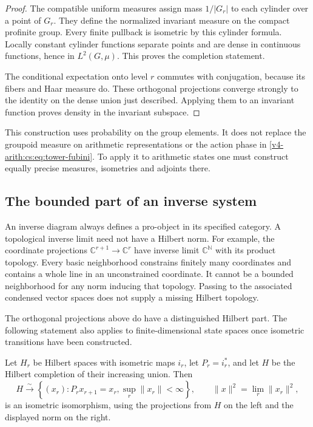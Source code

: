 \begin{proof}
The compatible uniform measures assign mass \(1/|G_r|\) to each cylinder
over a point of \(G_r\). They define the normalized invariant measure on the
compact profinite group. Every finite pullback is isometric by this cylinder
formula. Locally constant cylinder functions separate points and are dense
in continuous functions, hence in \(L^2(G,\mu)\). This proves the completion
statement.

The conditional expectation onto level \(r\) commutes with conjugation,
because its fibers and Haar measure do. These orthogonal projections
converge strongly to the identity on the dense union just described.
Applying them to an invariant function proves density in the invariant
subspace.
\end{proof}

This construction uses probability on the group elements. It does not
replace the groupoid measure on arithmetic representations or the action
phase in \eqref{v4-arith:cs:eq:tower-fubini}. To apply it to arithmetic
states one must construct equally precise measures, isometries and adjoints
there.

\subsection{The bounded part of an inverse system}

An inverse diagram always defines a pro-object in its specified category. A
topological inverse limit need not have a Hilbert norm. For example, the
coordinate projections \(\mathbb C^{r+1}\to\mathbb C^r\) have inverse limit
\(\mathbb C^{\mathbb N}\) with its product topology. Every basic
neighborhood constrains finitely many coordinates and contains a whole line
in an unconstrained coordinate. It cannot be a bounded neighborhood for any
norm inducing that topology. Passing to the associated condensed vector
spaces does not supply a missing Hilbert topology.

The orthogonal projections above do have a distinguished Hilbert part. The
following statement also applies to finite-dimensional state spaces once
isometric transitions have been constructed.

\begin{proposition}
\label{v4-arith:cs:prop:martingale}
Let \(H_r\) be Hilbert spaces with isometric maps \(i_r\), let
\(P_r=i_r^*\), and let \(H\) be the Hilbert completion of their increasing
union. Then
\begin{equation}
 H\xrightarrow{\sim}
 \left\{(x_r):P_rx_{r+1}=x_r,
                   \sup_r\|x_r\|<\infty\right\},
 \qquad
 \|x\|^2=\lim_r\|x_r\|^2,
 \label{v4-arith:cs:eq:bounded-limit}
\end{equation}
is an isometric isomorphism, using the projections from \(H\) on the left
and the displayed norm on the right.
\end{proposition}

